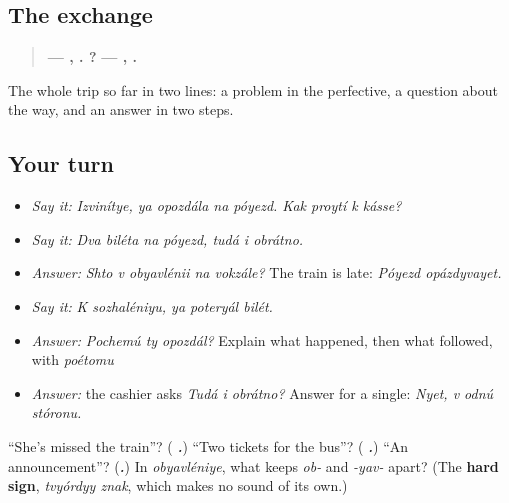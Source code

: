 \subsection*{The exchange}
\begin{quote}
\textbf{— ,    .    ?} \textbf{—  ,  .}
\end{quote}

The whole trip so far in two lines: a problem in the perfective, a question about the way, and an answer in two steps.

\subsection*{Your turn}
\begin{itemize}
\raggedright
  \item \emph{Say it:} \emph{Izvinítye, ya opozdála na póyezd. Kak proytí k kásse?}
  \item \emph{Say it:} \emph{Dva biléta na póyezd, tudá i obrátno.}
  \item \emph{Answer:} \emph{Shto v obyavlénii na vokzále?} The train is late: \emph{Póyezd opázdyvayet.}
  \item \emph{Say it:} \emph{K sozhaléniyu, ya poteryál bilét.}
  \item \emph{Answer:} \emph{Pochemú ty opozdál?} Explain what happened, then what followed, with \emph{poétomu}
  \item \emph{Answer:} the cashier asks \emph{Tudá i obrátno?} Answer for a single: \emph{Nyet, v odnú stóronu.}
\end{itemize}

\begin{tcolorbox}[breakable,colback=teal!4,colframe=teal!35!black,title={Before you move on}]
\textquotedblleft{}She's missed the train\textquotedblright{}? (\emph{\textbf{   .}}) \textquotedblleft{}Two tickets for the bus\textquotedblright{}? (\emph{\textbf{   .}}) \textquotedblleft{}An announcement\textquotedblright{}? (\emph{\textbf{.}}) In \emph{obyavléniye}, what keeps \emph{ob-} and \emph{-yav-} apart? (The \textbf{hard sign}, \emph{tvyórdyy znak}, which makes no sound of its own.)
\end{tcolorbox}
